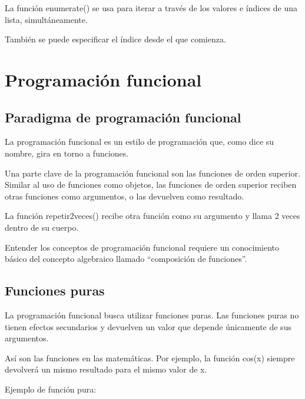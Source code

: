 \documentclass{report}
\newcommand{\doble}[1]{``#1''}
\begin{document}
{La función enumerate() se usa para iterar a través de los valores e índices de una lista, simultáneamente.


También se puede especificar el índice desde el que comienza.


\clearpage\chapter{Programación funcional}

\section{Paradigma de programación funcional}

La programación funcional es un estilo de programación que, como dice su nombre, gira en torno a funciones.

Una parte clave de la programación funcional son las funciones de orden superior. Similar al uso de funciones como objetos, las funciones de orden superior reciben otras funciones como argumentos, o las devuelven como resultado.


La función repetir2veces() recibe otra función como su argumento y llama 2 veces dentro de su cuerpo.

Entender los conceptos de programación funcional requiere un conocimiento básico del concepto algebraico llamado \doble{composición de funciones}.


\section{Funciones puras}

La programación funcional busca utilizar funciones puras. Las funciones puras no tienen efectos secundarios y devuelven un valor que depende únicamente de sus argumentos.

Así son las funciones en las matemáticas. Por ejemplo, la función cos(x) siempre devolverá un mismo resultado para el mismo valor de x.

Ejemplo de función pura:


}
\end{document}
